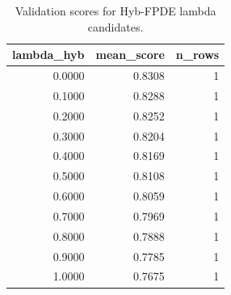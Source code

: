 \begin{table}[t]
\caption{Validation scores for Hyb-FPDE lambda candidates.}
\label{tab:lambda_distribution_computed}
\centering
\begin{tabular}{rrr}
\toprule
lambda\_hyb & mean\_score & n\_rows \\
\midrule
0.0000 & 0.8308 & 1 \\
0.1000 & 0.8288 & 1 \\
0.2000 & 0.8252 & 1 \\
0.3000 & 0.8204 & 1 \\
0.4000 & 0.8169 & 1 \\
0.5000 & 0.8108 & 1 \\
0.6000 & 0.8059 & 1 \\
0.7000 & 0.7969 & 1 \\
0.8000 & 0.7888 & 1 \\
0.9000 & 0.7785 & 1 \\
1.0000 & 0.7675 & 1 \\
\bottomrule
\end{tabular}

\end{table}
